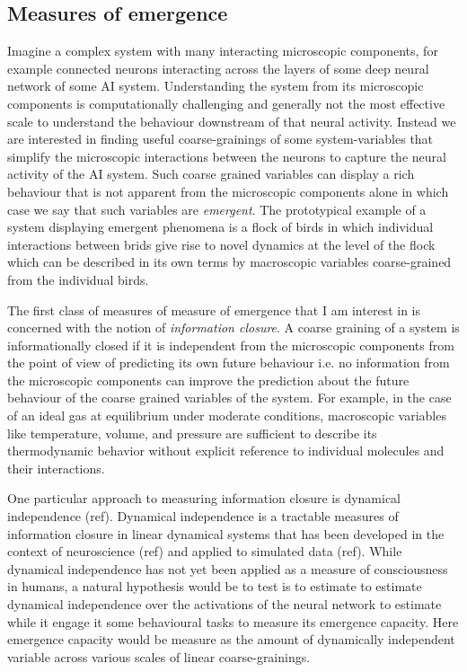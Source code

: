 \documentclass[11pt,a4paper]{article}
\begin{document}
\subsection{Measures of emergence}
Imagine a complex system with many interacting microscopic components, for example connected neurons interacting across the layers of some deep neural network of some AI system. Understanding the system from its microscopic components is computationally challenging and generally not the most effective scale to understand the behaviour downstream of that neural activity. Instead we are interested in finding useful coarse-grainings of some system-variables that simplify the microscopic interactions between the neurons to capture the neural activity of the AI system. Such coarse grained variables can display a rich behaviour that is not apparent from the microscopic components alone in which case we say that such variables are \textit{emergent}. The prototypical example of a system displaying emergent phenomena is a flock of birds in which individual interactions between brids give rise to novel dynamics at the level of the flock which can be described in its own terms by macroscopic variables coarse-grained from the individual birds.

The first class of measures of measure of emergence that I am interest in is concerned with the notion of \textit{information closure}. A coarse graining of a system is informationally closed if it is independent from the microscopic components from the point of view of predicting its own future behaviour i.e. no information from the microscopic components can improve the prediction about the future behaviour of the coarse grained variables of the system. For example, in the case of an ideal gas at equilibrium under moderate conditions, macroscopic variables like temperature, volume, and pressure are sufficient to describe its thermodynamic behavior without explicit reference to individual molecules and their interactions. 

One particular approach to measuring information closure is dynamical independence (ref). Dynamical independence is a tractable measures of information closure in linear dynamical systems that has been developed in the context of neuroscience (ref) and applied to simulated data (ref). While dynamical independence has not yet been applied as a measure of consciousness in humans, a natural hypothesis would be to test is to estimate to estimate dynamical independence over the activations of the neural network to estimate while it engage it some behavioural tasks to measure its emergence capacity. Here emergence capacity would be measure as the amount of dynamically independent variable across various scales of linear coarse-grainings.  
\end{document}
